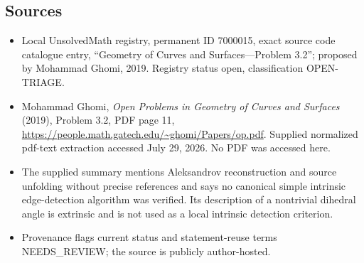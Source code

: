 \documentclass[11pt]{article}
\begin{document}
\subsection{Sources}
\begin{itemize}
\item Local UnsolvedMath registry, permanent ID 7000015, exact source code catalogue entry, ``Geometry of Curves and Surfaces---Problem 3.2''; proposed by Mohammad Ghomi, 2019. Registry status open, classification OPEN-TRIAGE.
\item Mohammad Ghomi, \emph{Open Problems in Geometry of Curves and Surfaces} (2019), Problem 3.2, PDF page 11, \url{https://people.math.gatech.edu/~ghomi/Papers/op.pdf}. Supplied normalized pdf-text extraction accessed July 29, 2026. No PDF was accessed here.
\item The supplied summary mentions Aleksandrov reconstruction and source unfolding without precise references and says no canonical simple intrinsic edge-detection algorithm was verified. Its description of a nontrivial dihedral angle is extrinsic and is not used as a local intrinsic detection criterion.
\item Provenance flags current status and statement-reuse terms NEEDS\_REVIEW; the source is publicly author-hosted.
\end{itemize}
\end{document}
